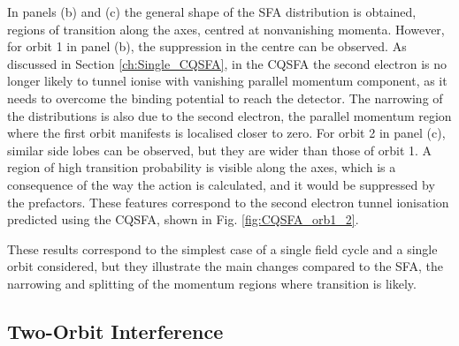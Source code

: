 \documentclass[11pt]{article}
\numberwithin{equation}{section}
\begin{document}
In panels (b) and (c) the general shape of the SFA distribution is obtained, regions of transition along the axes, centred at nonvanishing momenta. However, for orbit 1 in panel (b), the suppression in the centre can be observed. As discussed in Section \ref{ch:Single_CQSFA}, in the CQSFA the second electron is no longer likely to tunnel ionise with vanishing parallel momentum component, as it needs to overcome the binding potential to reach the detector. The narrowing of the distributions is also due to the second electron, the parallel momentum region where the first orbit manifests is localised closer to zero. For orbit 2 in panel (c), similar side lobes can be observed, but they are wider than those of orbit 1. A region of high transition probability is visible along the axes, which is a consequence of the way the action is calculated, and it would be suppressed by the prefactors\cite{maxwell_2017_coulombcorrected}. These features correspond to the second electron tunnel ionisation predicted using the CQSFA, shown in Fig. \ref{fig:CQSFA_orb1_2}.
\par
These results correspond to the simplest case of a single field cycle and a single orbit considered, but they illustrate the main changes compared to the SFA, the narrowing and splitting of the momentum regions where transition is likely.

\subsection{Two-Orbit Interference}\label{ch:two_orbit}
\end{document}
